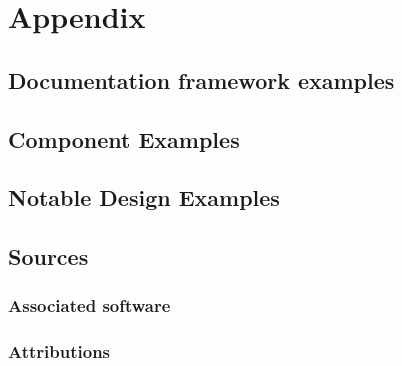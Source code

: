 \documentclass[a4paper, 11pt, twoside]{book}
\begin{document}
\part{Appendix}\label{part:appendix}
\backmatter
{}
\pagecolor{pgcolor}

\chapter{Documentation framework examples}\label{ch:documentation-framework-examples}


\chapter{Component Examples}\label{ch:component-examples}


\chapter{Notable Design Examples}\label{ch:notable-design-examples}

\newpage
\chapter{Sources}\label{ch:sources}
\printglossary[type=team]
\newpage
\section{Associated software} \label{sec:associated-software}

\newpage
\section{Attributions} \label{sec:attributions}

%
%

\end{document}
